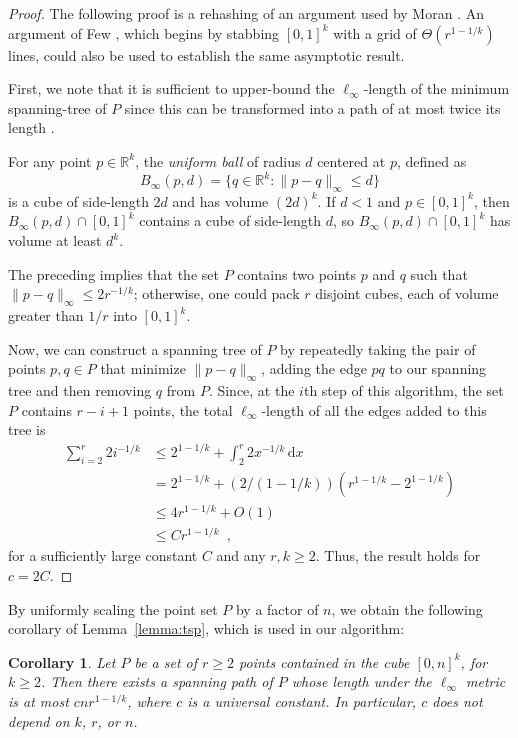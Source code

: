 \documentclass[11pt]{patmorin}
\newtheorem{corollary}[theorem]{Corollary}
\newcommand{\R}{\mathbb{R}}
\begin{document}
\begin{proof}
The following proof is a rehashing of an argument used by Moran
\cite{moran:on}. An argument of Few \cite{few:shortest}, which begins
by stabbing $[0,1]^k$ with a grid of $\Theta(r^{1-1/k})$ lines, could
also be used to establish the same asymptotic result.

First, we note that it is sufficient to upper-bound the $\ell_\infty$-length of the minimum spanning-tree of $P$ since this
can be transformed into a path of at most twice its length \cite{rosenkrantz.stearns.ea:analysis}.

For any point $p\in\R^k$, the \emph{uniform ball} of radius $d$ centered at $p$,
defined as
\[
    B_\infty(p,d)=\{q\in\R^k : \|p-q\|_\infty \le d\}
\]
is a cube of side-length $2d$ and has volume $(2d)^k$.  If $d< 1$ and
$p\in [0,1]^k$, then $B_\infty(p,d)\cap [0,1]^k$ contains a cube of side-length $d$, so $B_\infty(p,d)\cap [0,1]^k$ has volume at least $d^k$.  

The preceding implies that the set $P$ contains two points $p$ and $q$
such that $\|p-q\|_\infty \le 2r^{-1/k}$; otherwise, one could pack $r$
disjoint cubes, each of volume greater than $1/r$ into $[0,1]^k$.

Now, we can construct a spanning tree of $P$ by repeatedly taking the
pair of points $p,q\in P$ that minimize $\|p-q\|_\infty$, adding the edge $pq$
to our spanning tree and then removing $q$ from $P$. Since, at the $i$th
step of this algorithm, the set $P$ contains $r-i+1$ points, the total $\ell_\infty$-length of all the edges added to this tree is
\begin{align*}
   \sum_{i=2}^{r} 2i^{-1/k} 
     & \le 2^{1-1/k} + \int_2^r 2x^{-1/k}\,\mathrm{d}x \\
     & = 2^{1-1/k} + (2/(1-1/k))\left(r^{1-1/k}-2^{1-1/k}\right) \\
     & \le 4r^{1-1/k} + O(1) \\
     & \le Cr^{1-1/k} \enspace ,
\end{align*}
for a sufficiently large constant $C$ and any $r,k\ge 2$. Thus, the result holds for $c=2C$.
\end{proof}

By uniformly scaling the point set $P$ by a factor of $n$, we obtain the following corollary of Lemma~\ref{lemma:tsp}, which is used in our algorithm:

\begin{corollary}\label{cor:tsp}
  Let $P$ be a set of $r\ge 2$ points contained in the cube $[0,n]^k$,
  for $k\ge 2$.  Then there exists a spanning path of
  $P$ whose length under the $\ell_\infty$ metric is at
  most $cnr^{1-1/k}$, where $c$ is a universal constant. In particular,
  $c$ does not depend on $k$, $r$, or $n$.
\end{corollary}
\end{document}

